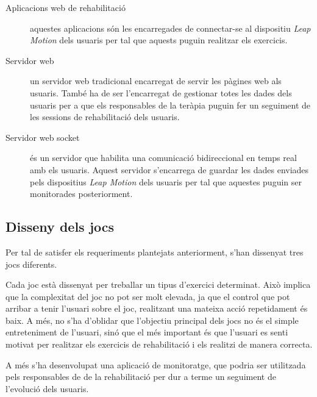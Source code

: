 \documentclass[12pt,a4paper,catalan]{article}
\begin{document}
	\begin{description}
		\item [Aplicacions web de rehabilitació] aquestes aplicacions són les encarregades de connectar-se al dispositiu \textit{Leap Motion} dels usuaris per tal que aquests puguin realitzar els exercicis.
		\item [Servidor web] un servidor web tradicional encarregat de servir les pàgines web als usuaris. També ha de ser l'encarregat de gestionar totes les dades dels usuaris per a que els responsables de la teràpia puguin fer un seguiment de les sessions de rehabilitació dels usuaris.
		\item [Servidor web socket] és un servidor que habilita una comunicació bidireccional en temps real amb els usuaris. Aquest servidor s'encarrega de guardar les dades enviades pels dispositius \textit{Leap Motion} dels usuaris per tal que aquestes puguin ser monitorades posteriorment.
	\end{description}
	\subsection{Disseny dels jocs}
	Per tal de satisfer els requeriments plantejats anteriorment, s'han dissenyat tres jocs diferents.
	
	Cada joc està dissenyat per treballar un tipus d'exercici determinat. Això implica que la complexitat del joc no pot ser molt elevada, ja que el control que pot arribar a tenir l'usuari sobre el joc, realitzant una mateixa acció repetidament és baix. A més, no s'ha d'oblidar que l'objectiu principal dels jocs no és el simple entreteniment de l'usuari, sinó que el més important és que l'usuari es senti motivat per realitzar els exercicis de rehabilitació i els realitzi de manera correcta.
	
	A més s'ha desenvolupat una aplicació de monitoratge, que podria ser utilitzada pels responsables de de la rehabilitació per dur a terme un seguiment de l'evolució dels usuaris.
\end{document}
